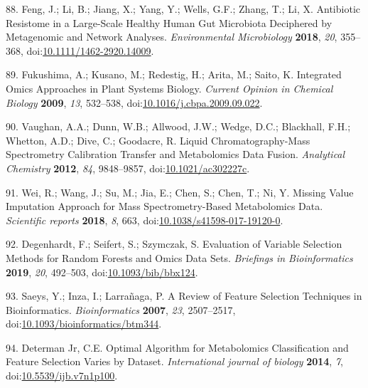 \documentclass[]{article}
\begin{document}
\leavevmode\hypertarget{ref-feng_2018}{}%
88. Feng, J.; Li, B.; Jiang, X.; Yang, Y.; Wells, G.F.; Zhang, T.; Li, X. Antibiotic Resistome in a Large-Scale Healthy Human Gut Microbiota Deciphered by Metagenomic and Network Analyses. \emph{Environmental Microbiology} \textbf{2018}, \emph{20}, 355--368, doi:\href{https://doi.org/10.1111/1462-2920.14009}{10.1111/1462-2920.14009}.

\leavevmode\hypertarget{ref-fukushima_2009}{}%
89. Fukushima, A.; Kusano, M.; Redestig, H.; Arita, M.; Saito, K. Integrated Omics Approaches in Plant Systems Biology. \emph{Current Opinion in Chemical Biology} \textbf{2009}, \emph{13}, 532--538, doi:\href{https://doi.org/10.1016/j.cbpa.2009.09.022}{10.1016/j.cbpa.2009.09.022}.

\leavevmode\hypertarget{ref-vaughan_2012}{}%
90. Vaughan, A.A.; Dunn, W.B.; Allwood, J.W.; Wedge, D.C.; Blackhall, F.H.; Whetton, A.D.; Dive, C.; Goodacre, R. Liquid Chromatography-Mass Spectrometry Calibration Transfer and Metabolomics Data Fusion. \emph{Analytical Chemistry} \textbf{2012}, \emph{84}, 9848--9857, doi:\href{https://doi.org/10.1021/ac302227c}{10.1021/ac302227c}.

\leavevmode\hypertarget{ref-wei_2018}{}%
91. Wei, R.; Wang, J.; Su, M.; Jia, E.; Chen, S.; Chen, T.; Ni, Y. Missing Value Imputation Approach for Mass Spectrometry-Based Metabolomics Data. \emph{Scientific reports} \textbf{2018}, \emph{8}, 663, doi:\href{https://doi.org/10.1038/s41598-017-19120-0}{10.1038/s41598-017-19120-0}.

\leavevmode\hypertarget{ref-degenhardt_2019}{}%
92. Degenhardt, F.; Seifert, S.; Szymczak, S. Evaluation of Variable Selection Methods for Random Forests and Omics Data Sets. \emph{Briefings in Bioinformatics} \textbf{2019}, \emph{20}, 492--503, doi:\href{https://doi.org/10.1093/bib/bbx124}{10.1093/bib/bbx124}.

\leavevmode\hypertarget{ref-saeys_2007}{}%
93. Saeys, Y.; Inza, I.; Larrañaga, P. A Review of Feature Selection Techniques in Bioinformatics. \emph{Bioinformatics} \textbf{2007}, \emph{23}, 2507--2517, doi:\href{https://doi.org/10.1093/bioinformatics/btm344}{10.1093/bioinformatics/btm344}.

\leavevmode\hypertarget{ref-determanjr_2014}{}%
94. Determan Jr, C.E. Optimal Algorithm for Metabolomics Classification and Feature Selection Varies by Dataset. \emph{International journal of biology} \textbf{2014}, \emph{7}, doi:\href{https://doi.org/10.5539/ijb.v7n1p100}{10.5539/ijb.v7n1p100}.
\end{document}
